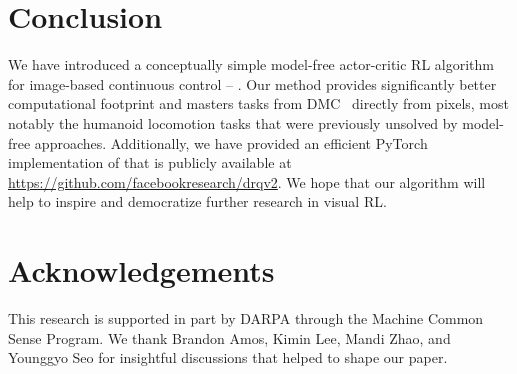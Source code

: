 \section{Conclusion}

We have introduced a conceptually simple model-free actor-critic RL algorithm for image-based continuous control -- \drqs{}. Our method provides significantly better computational footprint and masters tasks from DMC~\citep{tassa2018dmcontrol} directly from pixels, most notably the humanoid locomotion tasks that were previously unsolved by model-free approaches. Additionally, we have provided an efficient PyTorch implementation of \drqs{} that is publicly available at \url{https://github.com/facebookresearch/drqv2}. We hope that our algorithm will help to inspire and democratize further research in visual RL.


\section{Acknowledgements}
This research is supported in part by DARPA through the
Machine Common Sense Program. We thank Brandon Amos, Kimin Lee, Mandi Zhao, and Younggyo Seo for insightful discussions that helped to shape our paper.
